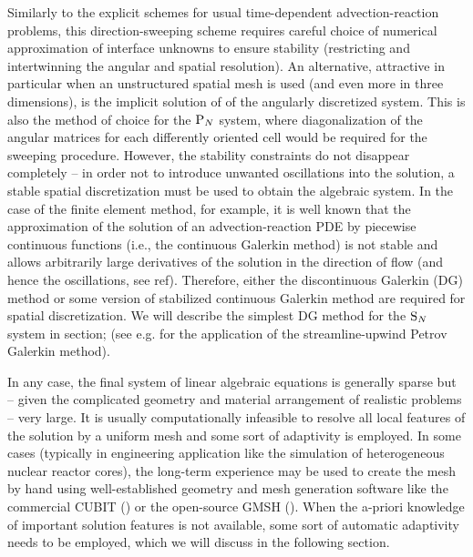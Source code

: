 Similarly to the explicit schemes for usual time-dependent advection-reaction problems, this direction-sweeping scheme
requires careful choice of numerical approximation of interface unknowns to ensure stability (restricting and
intertwinning the angular and spatial resolution). An alternative, attractive in particular when an unstructured
spatial mesh is used (and even more in three dimensions), is the implicit solution of of the angularly discretized
system. This is also the method of choice for the $\text{P}_{N}$ system, where diagonalization of the angular matrices for each
differently oriented cell would be required for the sweeping procedure. However, the stability constraints do not
disappear completely -- in order not to introduce unwanted oscillations into the solution, a stable spatial
discretization must be used to obtain the algebraic system. In the case of the finite element method, for example, it is
well known that the approximation of the solution of an advection-reaction PDE by piecewise continuous functions (i.e.,
the continuous Galerkin method) is not stable and allows arbitrarily large derivatives of the solution in the direction
of flow (and hence the oscillations, see \alert{ref}).
Therefore, either the discontinuous Galerkin (DG) method or some version of stabilized continuous Galerkin method are
required for spatial discretization. We will describe the simplest DG method for the $\text{S}_{N}$ system in \alert{section};
(see e.g.
\cite{Meinkohn} for the application of the streamline-upwind Petrov Galerkin method).


In any case, the final system of linear algebraic equations is generally sparse but -- given the complicated geometry
and material arrangement of realistic problems -- very large. It is usually computationally infeasible to resolve all
local features of the solution by a uniform mesh and some sort of adaptivity is employed. In some cases (typically in
engineering application like the simulation of heterogeneous nuclear reactor cores), the long-term experience may be
used to create the mesh by hand using well-established geometry and mesh generation software like the commercial CUBIT
(\cite{CUBIT}) or the open-source GMSH (\cite{GMSH}). When the a-priori knowledge of important solution features is not
available, some sort of automatic adaptivity needs to be employed, which we will discuss in the following section.

